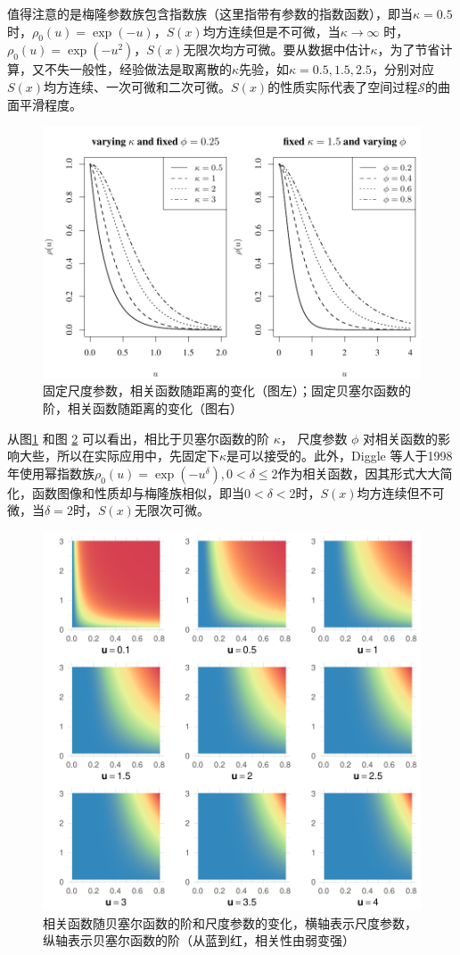 \documentclass[hyperref, a4paper, UTF8, zihao = -4, linespread = 1.25, scheme = chinese]{ctexbook}
\begin{document}
值得注意的是梅隆参数族包含指数族（这里指带有参数的指数函数），即当\(\kappa=0.5\)时，\(\rho_{0}(u)=\exp(-u)\)，\(S(x)\)均方连续但是不可微，当\(\kappa \to \infty\)
时，\(\rho_{0}(u)=\exp(-u^2)\)，\(S(x)\)无限次均方可微。要从数据中估计\(\kappa\)，为了节省计算，又不失一般性，经验做法是取离散的\(\kappa\)先验，如\(\kappa=0.5,1.5,2.5\)，分别对应\(S(x)\)均方连续、一次可微和二次可微。\(S(x)\)的性质实际代表了空间过程\(\mathcal{S}\)的曲面平滑程度。

\begin{figure}

{\centering \includegraphics[width=0.7\linewidth]{figures/matern} 

}

\caption{固定尺度参数，相关函数随距离的变化（图左）；固定贝塞尔函数的阶，相关函数随距离的变化（图右）}\label{fig:matern-2d}
\end{figure}

从图\ref{fig:matern-2d} 和图 \ref{fig:matern-3d}
可以看出，相比于贝塞尔函数的阶 \(\kappa\)， 尺度参数 \(\phi\)
对相关函数的影响大些，所以在实际应用中，先固定下\(\kappa\)是可以接受的。此外，Diggle
等人于1998年使用幂指数族\(\rho_{0}(u)=\exp(-u^{\delta}), 0 < \delta \leq 2\)作为相关函数\citep{Diggle1998}，因其形式大大简化，函数图像和性质却与梅隆族相似，即当\(0<\delta<2\)时，\(S(x)\)均方连续但不可微，当\(\delta=2\)时，\(S(x)\)无限次可微。

\begin{figure}

{\centering \includegraphics[width=0.7\linewidth]{figures/matern-3d} 

}

\caption{相关函数随贝塞尔函数的阶和尺度参数的变化，横轴表示尺度参数，纵轴表示贝塞尔函数的阶（从蓝到红，相关性由弱变强）}\label{fig:matern-3d}
\end{figure}
\end{document}
